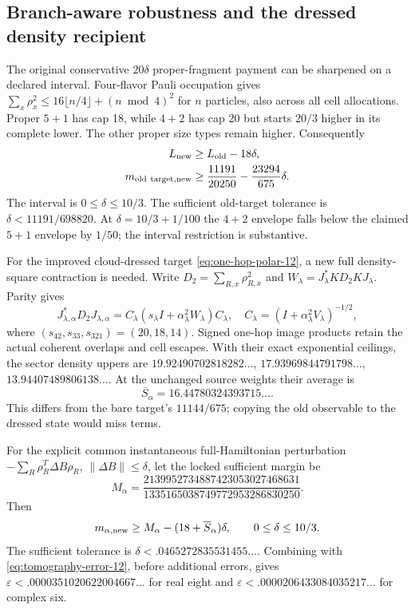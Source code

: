 \subsection{Branch-aware robustness and the dressed density recipient}
\label{sec:robustness-12}

The original conservative $20\delta$ proper-fragment payment can be
sharpened on a declared interval. Four-flavor Pauli occupation gives
$\sum_x\rho_x^2\le16\lfloor n/4\rfloor+(n\bmod4)^2$ for $n$ particles,
also across all cell allocations. Proper $5+1$ has cap 18, while $4+2$
has cap 20 but starts $20/3$ higher in its complete lower. The other
proper size types remain higher. Consequently
\begin{align}
 L_{\rm new}&\ge L_{\rm old}-18\delta,\\
 m_{{\rm old\ target},{\rm new}}
 &\ge\frac{11191}{20250}-\frac{23294}{675}\delta.
\end{align}
The interval is $0\le\delta\le10/3$. The sufficient old-target tolerance is $\delta<11191/698820$.
At $\delta=10/3+1/100$ the $4+2$ envelope falls below the claimed
$5+1$ envelope by $1/50$; the interval restriction is substantive.

For the improved cloud-dressed target \eqref{eq:one-hop-polar-12}, a new
full density-square contraction is needed. Write
$D_2=\sum_{R,x}\rho_{R,x}^2$ and
$W_\lambda=J_\lambda^*KD_2KJ_\lambda$. Parity gives
\begin{equation}
 J_{\lambda,\alpha}^*D_2J_{\lambda,\alpha}
 =C_\lambda(s_\lambda I+\alpha_\lambda^2W_\lambda)C_\lambda,
 \quad C_\lambda=(I+\alpha_\lambda^2V_\lambda)^{-1/2},
\end{equation}
where $(s_{42},s_{33},s_{321})=(20,18,14)$.
Signed one-hop image products retain the actual coherent overlaps and
cell escapes. With their exact exponential ceilings, the sector density
uppers are $19.92490702818282\ldots$, $17.93969844791798\ldots$,
$13.94407489806138\ldots$. At the unchanged source weights their average is
\begin{equation}
 \overline S_\alpha=16.44780324393715\ldots.
\end{equation}
This differs from the bare target's $11144/675$; copying the old observable
to the dressed state would miss terms.

For the explicit common instantaneous full-Hamiltonian perturbation
$-\sum_R\rho_R^T\Delta B\rho_R$, $\|\Delta B\|\le\delta$, let the locked sufficient margin be
\begin{equation}
 M_\alpha=\frac{2139952734887423053027468631}
                  {1335165038749772953286830250}.
\end{equation}
Then
\begin{equation}
 m_{\alpha,\rm new}\ge
 M_\alpha-(18+\overline S_\alpha)\delta,\qquad0\le\delta\le10/3.
\end{equation}
The sufficient tolerance is $\delta<.0465272835531455\ldots$.
Combining with \eqref{eq:tomography-error-12}, before additional errors,
gives $\varepsilon<.0000351020622004667\ldots$ for real eight and
$\varepsilon<.0000206433084035217\ldots$ for complex six.

